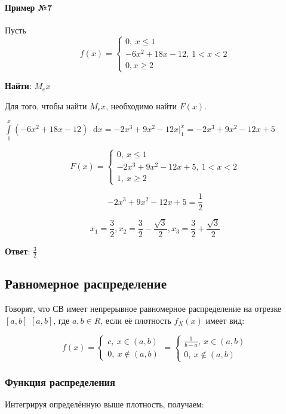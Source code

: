 \documentclass{article}
\newcommand*\diff{\mathop{}\!\mathrm{d}}
\begin{document}
\paragraph{Пример №7}

Пусть $$f(x) = \begin{cases}
    0, \ x \le 1 \\
    -6x^2 + 18x - 12, \ 1 < x < 2 \\
    0, x \ge 2
\end{cases}$$

\textbf{Найти}: $M_e x$

Для того, чтобы найти $M_e x$, необходимо найти $F(x)$.

$\int\limits_{1}^{x} (-6x^2 + 18x - 12) \diff x = -2x^3 + 9x^2 - 12 x \bigg|_1^x = -2x^3 + 9x^2 - 12x + 5$

$$F(x) = \begin{cases}
    0, \ x \le 1 \\
    -2x^3 + 9x^2 - 12x + 5, \ 1 < x < 2 \\
    1, \ x \ge 2
\end{cases}$$

$$-2x^3 + 9x^2 - 12x + 5 = \frac{1}{2}$$

$$x_1 = \frac{3}{2}, x_2 = \frac{3}{2} - \frac{\sqrt{3}}{2}, x_3 = \frac{3}{2} + \frac{\sqrt{3}}{2}$$

\textbf{Ответ}: $\frac{3}{2}$

\subsection{Равномерное распределение}

Говорят, что СВ имеет непрерывное равномерное распределение на отрезке $[ a , b ]$ $[a,b]$, где $a,b \in R$, если её плотность $f_{X}(x)$ имеет вид: 

$$f(x) = \begin{cases}
    c, \ x \in (a, b) \\
    0, \ x \notin (a, b)
\end{cases} = \begin{cases}
    \frac{1}{b - a}, \ x \in (a, b) \\
    0, \ x \notin (a, b)
\end{cases}$$

\subsubsection{Функция распределения}

Интегрируя определённую выше плотность, получаем: 
\end{document}
